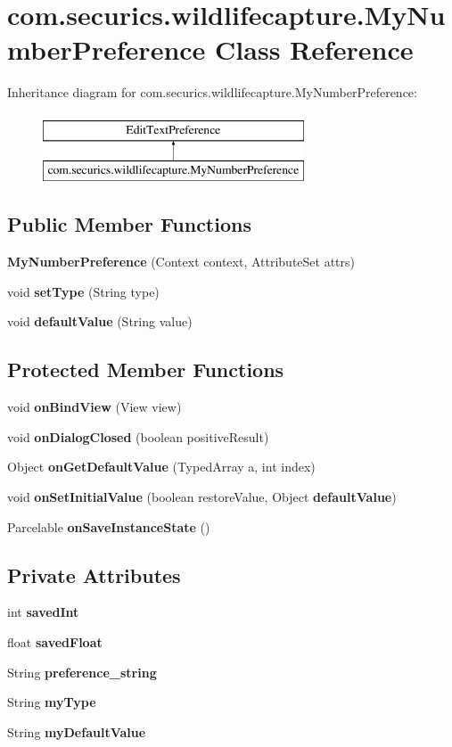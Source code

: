\section{com.\+securics.\+wildlifecapture.\+My\+Number\+Preference Class Reference}
\label{classcom_1_1securics_1_1wildlifecapture_1_1_my_number_preference}
Inheritance diagram for com.\+securics.\+wildlifecapture.\+My\+Number\+Preference\+:\begin{figure}[H]
\begin{center}
\leavevmode
\includegraphics[height=2.000000cm]{classcom_1_1securics_1_1wildlifecapture_1_1_my_number_preference}
\end{center}
\end{figure}
\subsection*{Public Member Functions}
\begin{DoxyCompactItemize}
\item 
{\bf My\+Number\+Preference} (Context context, Attribute\+Set attrs)
\item 
void {\bf set\+Type} (String type)
\item 
void {\bf default\+Value} (String value)
\end{DoxyCompactItemize}
\subsection*{Protected Member Functions}
\begin{DoxyCompactItemize}
\item 
void {\bf on\+Bind\+View} (View view)
\item 
void {\bf on\+Dialog\+Closed} (boolean positive\+Result)
\item 
Object {\bf on\+Get\+Default\+Value} (Typed\+Array a, int index)
\item 
void {\bf on\+Set\+Initial\+Value} (boolean restore\+Value, Object {\bf default\+Value})
\item 
Parcelable {\bf on\+Save\+Instance\+State} ()
\end{DoxyCompactItemize}
\subsection*{Private Attributes}
\begin{DoxyCompactItemize}
\item 
int {\bf saved\+Int}
\item 
float {\bf saved\+Float}
\item 
String {\bf preference\+\_\+string}
\item 
String {\bf my\+Type}
\item 
String {\bf my\+Default\+Value}
\end{DoxyCompactItemize}


